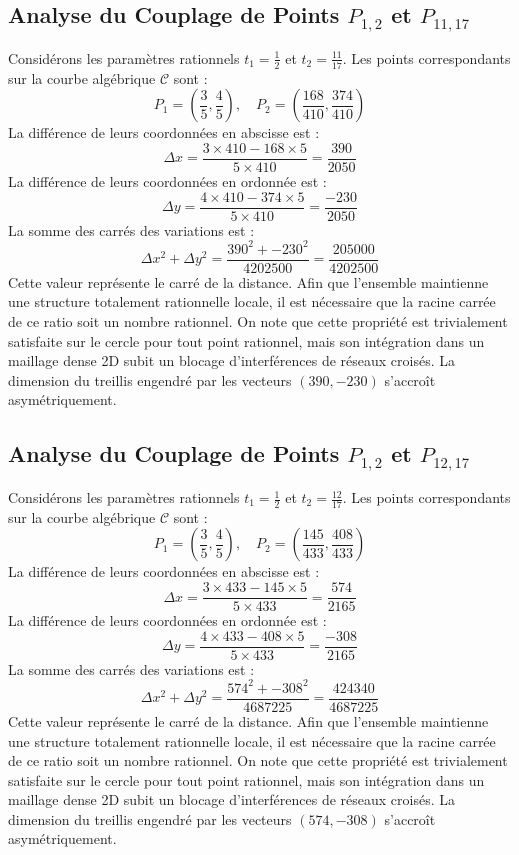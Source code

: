 \documentclass[12pt, a4paper]{article}
\begin{document}
\subsection{Analyse du Couplage de Points $P_{1,2}$ et $P_{11,17}$}
Considérons les paramètres rationnels $t_1 = \frac{1}{2}$ et $t_2 = \frac{11}{17}$.
Les points correspondants sur la courbe algébrique $\mathcal{C}$ sont :
$$ P_1 = \left( \frac{3}{5}, \frac{4}{5} \right), \quad P_2 = \left( \frac{168}{410}, \frac{374}{410} \right) $$
La différence de leurs coordonnées en abscisse est :
$$ \Delta x = \frac{3 \times 410 - 168 \times 5}{5 \times 410} = \frac{390}{2050} $$
La différence de leurs coordonnées en ordonnée est :
$$ \Delta y = \frac{4 \times 410 - 374 \times 5}{5 \times 410} = \frac{-230}{2050} $$
La somme des carrés des variations est :
$$ \Delta x^2 + \Delta y^2 = \frac{ 390^2 + -230^2 }{ 4202500 } = \frac{ 205000 }{ 4202500 } $$
Cette valeur représente le carré de la distance. Afin que l'ensemble maintienne une structure totalement rationnelle locale, il est nécessaire que la racine carrée de ce ratio soit un nombre rationnel. On note que cette propriété est trivialement satisfaite sur le cercle pour tout point rationnel, mais son intégration dans un maillage dense 2D subit un blocage d'interférences de réseaux croisés. La dimension du treillis engendré par les vecteurs $( 390, -230 )$ s'accroît asymétriquement.


\subsection{Analyse du Couplage de Points $P_{1,2}$ et $P_{12,17}$}
Considérons les paramètres rationnels $t_1 = \frac{1}{2}$ et $t_2 = \frac{12}{17}$.
Les points correspondants sur la courbe algébrique $\mathcal{C}$ sont :
$$ P_1 = \left( \frac{3}{5}, \frac{4}{5} \right), \quad P_2 = \left( \frac{145}{433}, \frac{408}{433} \right) $$
La différence de leurs coordonnées en abscisse est :
$$ \Delta x = \frac{3 \times 433 - 145 \times 5}{5 \times 433} = \frac{574}{2165} $$
La différence de leurs coordonnées en ordonnée est :
$$ \Delta y = \frac{4 \times 433 - 408 \times 5}{5 \times 433} = \frac{-308}{2165} $$
La somme des carrés des variations est :
$$ \Delta x^2 + \Delta y^2 = \frac{ 574^2 + -308^2 }{ 4687225 } = \frac{ 424340 }{ 4687225 } $$
Cette valeur représente le carré de la distance. Afin que l'ensemble maintienne une structure totalement rationnelle locale, il est nécessaire que la racine carrée de ce ratio soit un nombre rationnel. On note que cette propriété est trivialement satisfaite sur le cercle pour tout point rationnel, mais son intégration dans un maillage dense 2D subit un blocage d'interférences de réseaux croisés. La dimension du treillis engendré par les vecteurs $( 574, -308 )$ s'accroît asymétriquement.
\end{document}
